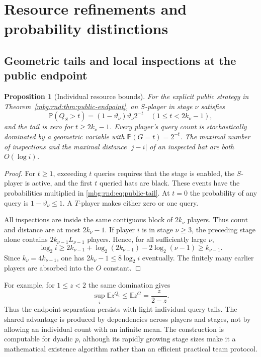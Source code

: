 \documentclass[11pt,letterpaper]{article}
\newtheorem{proposition}[theorem]{Proposition}
\theoremstyle{definition}
\newcommand{\E}{\mathbb E}
\newcommand{\Prb}{\mathbb P}
\begin{document}
\section{Resource refinements and probability distinctions}
\label{mbg:rnd:sec:refinements}

\subsection{Geometric tails and local inspections at the public endpoint}

\begin{proposition}[Individual resource bounds]
\label{mbg:rnd:prop:resources}
For the explicit public strategy in Theorem~\ref{mbg:rnd:thm:public-endpoint}, an
$S$-player in stage $\nu$ satisfies
\begin{equation}
 \Prb(Q_S>t)=(1-\vartheta_\nu)\vartheta_\nu2^{-t}
 \quad(1\le t<2k_\nu-1),
 \label{mbg:rnd:eq:public-tail}
\end{equation}
and the tail is zero for $t\ge2k_\nu-1$. Every player's query count is
stochastically dominated by a geometric variable with
$\Prb(G=t)=2^{-t}$. The maximal number of inspections and the maximal
distance $|j-i|$ of an inspected hat are both $O(\log i)$.
\end{proposition}
\begin{proof}
For $t\ge1$, exceeding $t$ queries requires that the stage is enabled,
the $S$-player is active, and the first $t$ queried hats are black.
These events have the probabilities multiplied in
\eqref{mbg:rnd:eq:public-tail}. At $t=0$ the probability of any query is
$1-\vartheta_\nu\le1$. A $T$-player makes either zero or one query.

All inspections are inside the same contiguous block of $2k_\nu$
players. Thus count and distance are at most $2k_\nu-1$. If player $i$
is in stage $\nu\ge3$, the preceding stage alone contains
$2k_{\nu-1}L_{\nu-1}$ players. Hence, for all sufficiently large $\nu$,
\[
 \log_2 i\ge
 2k_{\nu-1}+\log_2(2k_{\nu-1})-2\log_2(\nu-1)\ge k_{\nu-1}.
\]
Since $k_\nu=4k_{\nu-1}$, one has $2k_\nu-1\le8\log_2 i$ eventually.
The finitely many earlier players are absorbed into the $O$ constant.
\end{proof}

For example, for $1\le z<2$ the same domination gives
\[
 \sup_i\E z^{Q_i}\le\E z^G=\frac{z}{2-z}.
\]
Thus the endpoint separation persists with light individual query
tails. The shared advantage is produced by dependencies across players
and stages, not by allowing an individual count with an infinite mean.
The construction is computable for dyadic $p$, although its rapidly
growing stage sizes make it a mathematical existence algorithm rather
than an efficient practical team protocol.
\end{document}
